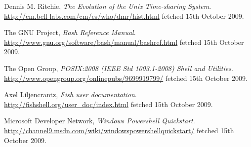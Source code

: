 \documentclass[12pt]{article}
\begin{document}
\begin{thebibliography}{9} %

  Dennis M. Ritchie,
  \emph{The Evolution of the Unix Time-sharing System}.
  \url{http://cm.bell-labs.com/cm/cs/who/dmr/hist.html} fetched 15th October
  2009.

  The GNU Project,
  \emph{Bash Reference Manual}.
  \url{http://www.gnu.org/software/bash/manual/bashref.html} fetched 15th
  October 2009.
 
  The Open Group,
  \emph{POSIX:2008 (IEEE Std 1003.1-2008) Shell and Utilities}.
  \url{http://www.opengroup.org/onlinepubs/9699919799/} fetched 15th October
  2009.

  Axel Liljencrantz,
  \emph{Fish user documentation}.
  \url{http://fishshell.org/user\_doc/index.html} fetched 15th October 2009.

  Microsoft Developer Network,
  \emph{Windows Powershell Quickstart}.
  \url{http://channel9.msdn.com/wiki/windowspowershellquickstart/} fetched
  15th October 2009.

\end{thebibliography}
\end{document}
